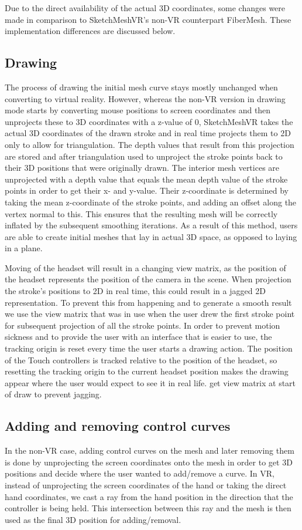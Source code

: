 Due to the direct availability of the actual 3D coordinates, some changes were made in comparison to SketchMeshVR's non-VR counterpart FiberMesh. These implementation differences are discussed below.

\subsection{Drawing}
The process of drawing the initial mesh curve stays mostly unchanged when converting to virtual reality. However, whereas the non-VR version in drawing mode starts by converting mouse positions to screen coordinates and then unprojects these to 3D coordinates with a z-value of 0, SketchMeshVR takes the actual 3D coordinates of the drawn stroke and in real time projects them to 2D only to allow for triangulation. The depth values that result from this projection are stored and after triangulation used to unproject the stroke points back to their 3D positions that were originally drawn. The interior mesh vertices are unprojected with a depth value that equals the mean depth value of the stroke points in order to get their x- and y-value. Their z-coordinate is determined by taking the mean z-coordinate of the stroke points, and adding an offset along the vertex normal to this. This ensures that the resulting mesh will be correctly inflated by the subsequent smoothing iterations. As a result of this method, users are able to create initial meshes that lay in actual 3D space, as opposed to laying in a plane. 

Moving of the headset will result in a changing view matrix, as the position of the headset represents the position of the camera in the scene. When projection the stroke's positions to 2D in real time, this could result in a jagged 2D representation. To prevent this from happening and to generate a smooth result we use the view matrix that was in use when the user drew the first stroke point for subsequent projection of all the stroke points.  
In order to prevent motion sickness and to provide the user with an interface that is easier to use, the tracking origin is reset every time the user starts a drawing action. The position of the Touch controllers is tracked relative to the position of the headset, so resetting the tracking origin to the current headset position makes the drawing appear where the user would expect to see it in real life. 
get view matrix at start of draw to prevent jagging. 

\subsection{Adding and removing control curves}
In the non-VR case, adding control curves on the mesh and later removing them is done by unprojecting the screen coordinates onto the mesh in order to get 3D positions and decide where the user wanted to add/remove a curve. In VR, instead of unprojecting the screen coordinates of the hand or taking the direct hand coordinates, we cast a ray from the hand position in the direction that the controller is being held. This intersection between this ray and the mesh is then used as the final 3D position for adding/removal.

